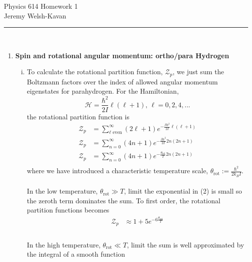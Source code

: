 \documentclass[]{article}
\begin{document}
{\Large Physics 614 Homework 1}\\
{Jeremy Welsh-Kavan}\\
\vspace{0.2 cm}
\noindent\rule{15cm}{0.4pt} \\
\begin{enumerate}[1)]

\item {\bf Spin and rotational angular momentum: ortho/para Hydrogen }
\begin{enumerate}[i.]
\item To calculate the rotational partition function, $\mathcal{Z}_p$, we just sum the Boltzmann factors over the index of allowed angular momentum eigenstates for parahydrogen. For the Hamiltonian,
\begin{equation}
\mathcal{H} = \frac{\hbar^2}{2I}\ell(\ell+1) \textrm{,  } \ell = 0, 2, 4,...
\end{equation}
the rotational partition function is
\begin{equation}
\begin{split}
\mathcal{Z}_p & = \sum_{\ell \text{ even}}^{\infty} (2\ell +1)e^{-\frac{\beta \hbar^2}{2I}\ell(\ell+1)} \\
\mathcal{Z}_p & = \sum_{n=0}^{\infty} (4n +1)e^{-\frac{\beta \hbar^2}{2I}2n(2n+1)} \\
\mathcal{Z}_p & = \sum_{n=0}^{\infty} (4n +1)e^{-\frac{\theta_{\text{rot}}}{T}2n(2n+1)} \\
\end{split}
\end{equation}
where we have introduced a characteristic temperature scale, $\theta_{\text{rot}} := \frac{\hbar^2}{2k_B I}$. \\
\hfill \\
In the low temperature, $\theta_{\text{rot}} \gg T$, limit the exponential in (2) is small so the zeroth term dominates the sum. To first order, the rotational partition functions becomes \\
\begin{equation}
\begin{split}
\mathcal{Z}_p & \approx 1 + 5e^{-6\frac{\theta_{\text{rot}}}{T}} \\
\end{split}
\end{equation}
\hfill \\
In the high temperature, $\theta_{\text{rot}} \ll T$, limit the sum is well approximated by the integral of a smooth function

\end{enumerate}
\end{enumerate}
\end{document}
